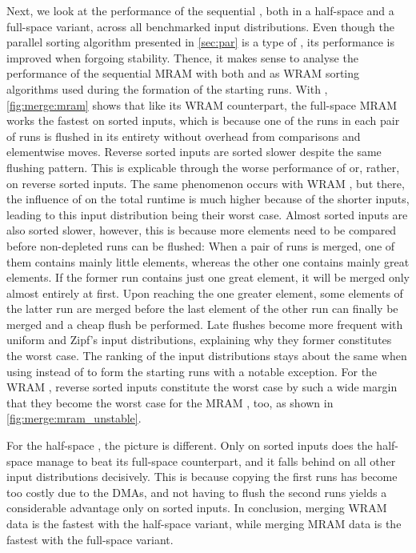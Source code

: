 Next, we look at the performance of the sequential \MS{}, both in a half-space and a full-space variant, across all benchmarked input distributions.
Even though the parallel sorting algorithm presented in \cref{sec:par} is a type of \MS{}, its performance is improved when forgoing stability.
Thence, it makes sense to analyse the performance of the sequential \ac{MRAM} \MS{} with both \QS{} and \MS{} as \ac{WRAM} sorting algorithms used during the formation of the starting runs.
With \QS{}, \cref{fig:merge:mram} shows that like its \ac{WRAM} counterpart, the full-space \ac{MRAM} \MS{} works the fastest on sorted inputs, which is because one of the runs in each pair of runs is flushed in its entirety without overhead from comparisons and elementwise moves.
Reverse sorted inputs are sorted slower despite the same flushing pattern.
This is explicable through the worse performance of \QS{} \Dash or, rather, \IS{} \Dash on reverse sorted inputs.
The same phenomenon occurs with \ac{WRAM} \MS*{}, but there, the influence of \IS{} on the total runtime is much higher because of the shorter inputs, leading to this input distribution being their worst case.
Almost sorted inputs are also sorted slower, however, this is because more elements need to be compared before non-depleted runs can be flushed:
When a pair of runs is merged, one of them contains mainly little elements, whereas the other one contains mainly great elements.
If the former run contains just one great element, it will be merged only almost entirely at first.
Upon reaching the one greater element, some elements of the latter run are merged before the last element of the other run can finally be merged and a cheap flush be performed.
Late flushes become more frequent with uniform and Zipf's input distributions, explaining why they former constitutes the worst case.
The ranking of the input distributions stays about the same when using \MS{} instead of \QS{} to form the starting runs with a notable exception.
For the \ac{WRAM} \MS{}, reverse sorted inputs constitute the worst case by such a wide margin that they become the worst case for the \ac{MRAM} \MS{}, too, as shown in \cref{fig:merge:mram_unstable}.

For the half-space \MS{}, the picture is different.
Only on sorted inputs does the half-space \MS{} manage to beat its full-space counterpart, and it falls behind on all other input distributions decisively.
This is because copying the first runs has become too costly due to the \acp{DMA}, and not having to flush the second runs yields a considerable advantage only on sorted inputs.
In conclusion, merging \ac{WRAM} data is the fastest with the half-space variant, while merging \ac{MRAM} data is the fastest with the full-space variant.
